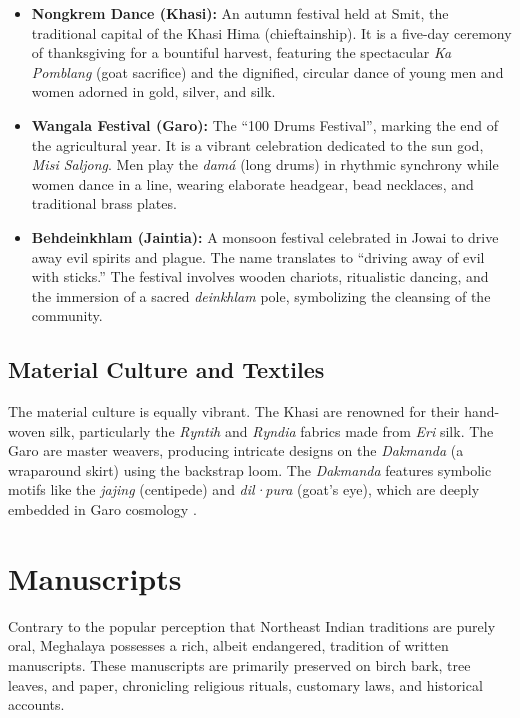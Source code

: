 \documentclass[12pt]{article}
\begin{document}
\begin{itemize}
    \item \textbf{Nongkrem Dance (Khasi):} An autumn festival held at Smit, the traditional capital of the Khasi Hima (chieftainship). It is a five-day ceremony of thanksgiving for a bountiful harvest, featuring the spectacular \textit{Ka Pomblang} (goat sacrifice) and the dignified, circular dance of young men and women adorned in gold, silver, and silk.
    \item \textbf{Wangala Festival (Garo):} The \enquote{100 Drums Festival}, marking the end of the agricultural year. It is a vibrant celebration dedicated to the sun god, \textit{Misi Saljong}. Men play the \textit{damá} (long drums) in rhythmic synchrony while women dance in a line, wearing elaborate headgear, bead necklaces, and traditional brass plates.
    \item \textbf{Behdeinkhlam (Jaintia):} A monsoon festival celebrated in Jowai to drive away evil spirits and plague. The name translates to \enquote{driving away of evil with sticks.} The festival involves wooden chariots, ritualistic dancing, and the immersion of a sacred \textit{deinkhlam} pole, symbolizing the cleansing of the community.
\end{itemize}

\subsection{Material Culture and Textiles}
The material culture is equally vibrant. The Khasi are renowned for their hand-woven silk, particularly the \textit{Ryntih} and \textit{Ryndia} fabrics made from \textit{Eri} silk. The Garo are master weavers, producing intricate designs on the \textit{Dakmanda} (a wraparound skirt) using the backstrap loom. The \textit{Dakmanda} features symbolic motifs like the \textit{jajing} (centipede) and \textit{dil·pura} (goat's eye), which are deeply embedded in Garo cosmology \citep{Kar2011}.

\section{Manuscripts}
Contrary to the popular perception that Northeast Indian traditions are purely oral, Meghalaya possesses a rich, albeit endangered, tradition of written manuscripts. These manuscripts are primarily preserved on birch bark, tree leaves, and paper, chronicling religious rituals, customary laws, and historical accounts.
\end{document}
